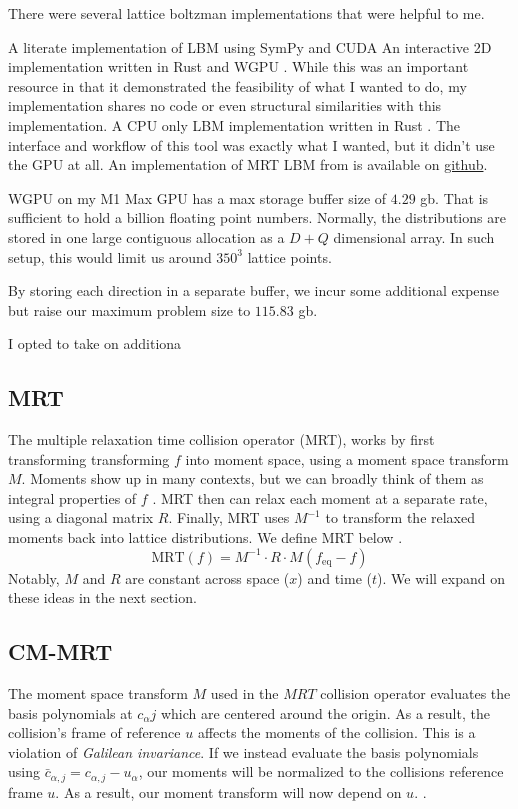 There were several lattice boltzman implementations that were helpful to me.
\begin{outline}
  \1 A literate implementation of LBM using SymPy and CUDA \cite{web:literate_lbm}
  \1 An interactive 2D implementation written in Rust and WGPU \cite{web:lbm-web}.
  \2 While this was an important resource in that it demonstrated 
  the feasibility of what I wanted to do, 
  my implementation shares no code or even structural similarities 
  with this implementation.
  \1 A CPU only LBM implementation written in Rust \cite{web:lbm-rs}.
  \2 The interface and workflow of this tool was exactly what I wanted, but it didn't use the GPU at all.
  \1 An implementation of MRT LBM from \cite{Yang2022} is available on \href{https://github.com/yjhp1016/taichi_LBM3D/}{github}.
\end{outline}

WGPU on my M1 Max GPU has a max storage buffer size of $4.29$ gb.
That is sufficient to hold a billion floating point numbers.
Normally, the distributions are stored in one large contiguous allocation 
as a $D+Q$ dimensional array.
In such setup, this would limit us around $350^3$ lattice points.

By storing each direction in a separate buffer, we incur some additional expense but raise our maximum problem size to $115.83$ gb.

I opted to take on additiona

\subsection{MRT}

The multiple relaxation time collision operator (MRT),
works by first transforming transforming $f$ into moment space,
using a moment space transform $M$.
Moments show up in many contexts, but we can broadly think of them
as integral properties of $f$ \cite{Taber2018}.
MRT then can relax each moment at a separate rate, using a diagonal matrix $R$.
Finally, MRT uses $M^{-1}$ to transform the relaxed moments
back into lattice distributions. We define MRT below \cite{De2017}.
$$
\text{MRT}(f) = M^{-1} \cdot R \cdot M (f_{\text{eq}} - f)
$$
Notably, $M$ and $R$ are constant across space ($x$) and time ($t$).
We will expand on these ideas in the next section.

\subsection{CM-MRT}\label{sec:cm-mrt}
The moment space transform $M$ used in the $MRT$ collision operator
evaluates the basis polynomials at $c_{\alpha}j$
which are centered around the origin.
As a result, the collision's frame of reference $u$ affects the 
moments of the collision.
This is a violation of \textit{Galilean invariance}.
If we instead evaluate the basis polynomials using 
$\bar{c}_{\alpha,j} = c_{\alpha, j} - u_{\alpha}$,
our moments will be normalized to the collisions reference frame $u$. 
As a result, our moment transform will now depend on $u$. \cite{De2017, De2019}.


